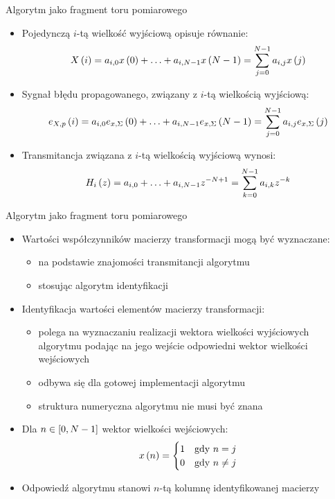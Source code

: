 \documentclass[12pt, polish, aspectratio = 169]{beamer}
\begin{document}
\begin{frame}{Algorytm jako fragment toru pomiarowego}
\begin{itemize}
\item Pojedynczą $i$-tą wielkość wyjściową opisuje równanie:
\begin{equation}
X \left(i\right) = a_{i, 0} x \left(0\right) + \hdots + a_{i, N-1} x \left(N-1\right) = \sum _{j = 0} ^{N-1} a_{i,j} x \left(j\right) \label{eq:alg_out_single}
\end{equation}
\item Sygnał błędu propagowanego, związany z $i$-tą wielkością wyjściową:
\begin{equation}
e_{X,p} \left(i\right) = a_{i, 0} e_{x,\Sigma} \left(0\right) + \hdots + a_{i, N-1} e_{x,\Sigma} \left(N-1\right) = \sum _{j = 0} ^{N-1} a_{i,j} e_{x,\Sigma} \left(j\right) \label{eq:alg_outerr}
\end{equation}
\item Transmitancja związana z $i$-tą wielkością wyjściową wynosi:
\begin{equation}
H_{i} \left(z\right) = a_{i, 0} + \hdots + a_{i, N-1} z^{-N+1} = \sum _{k = 0} ^{N-1} a_{i, k} z^{-k} \label{eq:alg_trans_single}
\end{equation}
\end{itemize}
\end{frame}

\begin{frame}{Algorytm jako fragment toru pomiarowego}
\begin{itemize}
\item Wartości współczynników macierzy transformacji mogą być wyznaczane:
	\begin{itemize}
	\item na podstawie znajomości transmitancji algorytmu
	\item stosując algorytm identyfikacji
	\end{itemize}
\item Identyfikacja wartości elementów macierzy transformacji:
	\begin{itemize}
	\item polega na wyznaczaniu realizacji wektora wielkości wyjściowych algorytmu podając na jego wejście odpowiedni wektor wielkości wejściowych
	\item odbywa się dla gotowej implementacji algorytmu
	\item struktura numeryczna algorytmu nie musi być znana
	\end{itemize}
\item Dla $n \in \interval{0}{N-1}$ wektor wielkości wejściowych:
\begin{equation}
x \emb{n} =
\begin{cases}
	1 & $gdy$~n = j \\
	0 & $gdy$~n \neq j
\end{cases}
\label{eq:wt_ident}
\end{equation}
\item Odpowiedź algorytmu stanowi $n$-tą kolumnę identyfikowanej macierzy
\end{itemize}
\end{frame}
\end{document}

